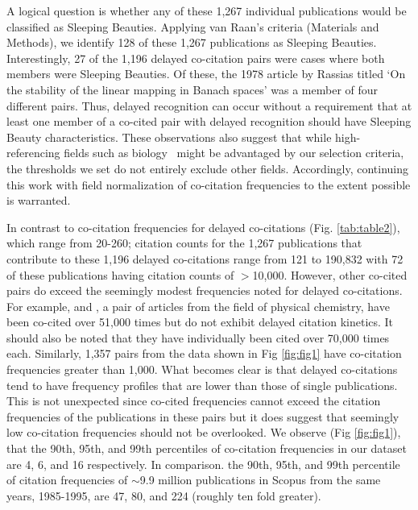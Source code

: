 \documentclass[utf8]{frontiersSCNS}
\begin{document}
A logical question is whether any of these 1,267 individual publications would be classified as Sleeping Beauties. Applying van Raan's criteria (Materials and Methods), we identify 128 of these 1,267 publications as Sleeping Beauties. Interestingly, 27 of the 1,196 delayed co-citation pairs were cases where both members were Sleeping Beauties. Of these, the 1978 article by Rassias titled `On the stability of the linear mapping in Banach spaces' was a member of four different pairs. Thus, delayed recognition can occur without a requirement that at least one member of a co-cited pair with delayed recognition should have Sleeping Beauty characteristics. These  observations also suggest that while high-referencing fields such as biology~\citep{Small1980} might be advantaged by our selection criteria, the thresholds we set do not entirely exclude other fields. Accordingly, continuing this work with field normalization of co-citation frequencies to the extent possible is warranted.

In contrast to co-citation frequencies for delayed co-citations (Fig. \ref{tab:table2}), which range from 20-260; citation counts for the 1,267 publications that contribute to these 1,196 delayed co-citations range from 121 to 190,832 with 72 of these publications having citation counts of $>$10,000. However, other co-cited pairs do exceed the seemingly modest frequencies noted for delayed co-citations. For example, \cite{becke_densityfunctional_1993} and \cite{lee_development_1988}, a pair of articles from the field of physical chemistry, have been co-cited over 51,000 times but do not exhibit delayed citation kinetics. It should also be noted that they have individually been cited over 70,000 times each. Similarly, 1,357 pairs from the data shown in Fig \ref{fig:fig1} have co-citation frequencies greater than 1,000. What becomes clear is that delayed co-citations tend to have frequency profiles that are lower than those of single publications. This is not unexpected since co-cited frequencies cannot exceed the citation frequencies of the publications in these pairs but it does suggest that seemingly low co-citation frequencies should not be overlooked. We observe (Fig \ref{fig:fig1}), that the 90th, 95th, and 99th percentiles of co-citation frequencies in our dataset are 4, 6, and 16 respectively. In comparison. the 90th, 95th, and 99th percentile of citation frequencies of $\sim$9.9 million publications in Scopus from the same years, 1985-1995, are 47, 80, and 224 (roughly ten fold greater).
\end{document}
